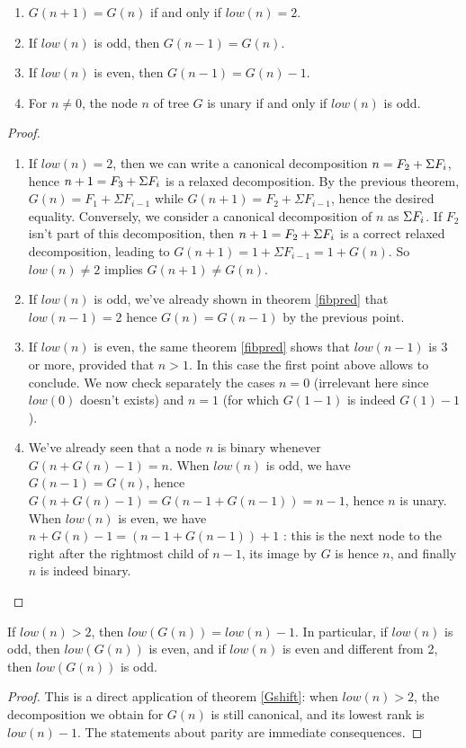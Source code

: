 \documentclass[a4paper,11pt]{article}
\begin{document}
\begin{theorem}\label{Gclass1}
\noindent
\begin{enumerate}
\item $G(n+1)=G(n)$ if and only if $low(n)=2$.
\item If $low(n)$ is odd, then $G(n-1)=G(n)$.
\item If $low(n)$ is even, then $G(n-1)=G(n)-1$.
\item For $n\neq 0$, the node $n$ of tree $G$
 is unary if and only if $low(n)$ is odd.
\end{enumerate}
\end{theorem}
\begin{proof}
\noindent
\begin{enumerate}
\item
If $low(n)=2$, then we can write a canonical decomposition
$n=F_2+\Sigma F_i$, hence
$n+1=F_3+\Sigma F_i$ is a relaxed decomposition. By the previous
theorem, $G(n) = F_1 + \Sigma F_{i-1}$ while
$G(n+1) = F_2 + \Sigma F_{i-1}$, hence the desired equality.
Conversely, we consider a canonical decomposition of $n$ as $\Sigma F_i$.
If $F_2$ isn't part of this decomposition, then $n+1=F_2+\Sigma F_i$
is a correct relaxed decomposition, leading to
$G(n+1)=1+\Sigma F_{i-1}=1+G(n)$. So $low(n)\neq 2$ implies
$G(n+1)\neq G(n)$.

\item If $low(n)$ is odd, we've already shown in theorem \ref{fibpred}
  that $low(n-1)=2$ hence $G(n)=G(n-1)$ by the previous point.

\item If $low(n)$ is even, the same theorem
 \ref{fibpred} shows that $low(n-1)$ is 3 or more, provided that $n>1$.
 In this case the first point above allows to conclude. We now check separately
 the cases $n=0$ (irrelevant here since $low(0)$ doesn't exists) and
 $n=1$ (for which $G(1-1)$ is indeed $G(1)-1$).

\item We've already seen that a node $n$ is binary whenever 
$G(n+G(n)-1) = n$. When $low(n)$ is odd, we have
$G(n-1)=G(n)$, hence $G(n+G(n)-1) = G(n-1+G(n-1)) = n-1$, hence $n$ is
  unary. When $low(n)$ is even, we have
$n+G(n)-1 = (n-1+G(n-1))+1$ : this is the next node to the right after
the rightmost child of $n-1$, its image by $G$ is hence $n$, and
finally $n$ is indeed binary.
\end{enumerate}
\end{proof}


\begin{theorem}\label{Glow}
If $low(n)>2$, then $low(G(n))=low(n)-1$. In particular,
if $low(n)$ is odd, then $low(G(n))$ is even, and if $low(n)$
is even and different from 2, then $low(G(n))$ is odd.
\end{theorem}
\begin{proof}
This is a direct application of theorem \ref{Gshift}:
when $low(n)>2$, the decomposition we obtain for $G(n)$ is
still canonical, and its lowest rank is $low(n)-1$.
The statements about parity are immediate consequences.
\end{proof}
\end{document}
